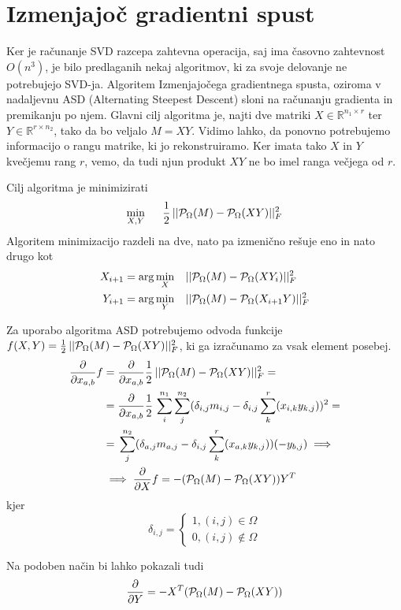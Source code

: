 \section{Izmenjajoč gradientni spust}
Ker je računanje SVD razcepa zahtevna operacija, saj ima časovno zahtevnost
$O(n^3)$, je bilo predlaganih nekaj algoritmov, ki za svoje delovanje ne potrebujejo SVD-ja. Algoritem Izmenjajočega gradientnega spusta, oziroma v nadaljevnu ASD (Alternating Steepest Descent) sloni na računanju gradienta in premikanju po njem. Glavni cilj algoritma je, najti dve matriki $X \in \mathbb{R}^{n_1 \times r}$ ter $Y \in \mathbb{R}^{r \times n_2}$, tako da bo veljalo $M = XY$. Vidimo lahko, da ponovno potrebujemo informacijo o rangu matrike, ki jo rekonstruiramo. Ker imata tako $X$ in $Y$ kvečjemu rang $r$, vemo, da tudi njun produkt $XY$ ne bo imel ranga večjega od $r$. 

Cilj algoritma je minimizirati 
\[
    \min_{X, Y} \hspace{0.5cm} \frac{1}{2}\, ||\mathcal{P}_\Omega(M) - \mathcal{P}_\Omega(XY)||^2_F
\] 
Algoritem minimizacijo razdeli na dve, nato pa izmenično rešuje eno in nato drugo kot 
\begin{align*}
    X_{i+1} &= \arg \min_{X} \hspace{0.3cm} ||\mathcal{P}_\Omega(M) - \mathcal{P}_\Omega(XY_i)||^2_F \\
    Y_{i+1} &= \arg \min_{Y} \hspace{0.3cm} ||\mathcal{P}_\Omega(M) - \mathcal{P}_\Omega(X_{i+1}Y)||^2_F
\end{align*}
\cite{AST-TK15}

Za uporabo algoritma ASD potrebujemo odvoda funkcije $f(X,Y) = \frac{1}{2}\, ||\mathcal{P}_\Omega(M) - \mathcal{P}_\Omega(XY)||^2_F$, ki ga izračunamo za vsak element posebej.
\begin{align*}
    \frac{\partial}{\partial x_{a,b}} f &= \frac{\partial}{\partial x_{a,b}} \frac{1}{2}\, ||\mathcal{P}_\Omega(M) - \mathcal{P}_\Omega(XY)||^2_F = \\
    &= \frac{\partial}{\partial x_{a,b}} \frac{1}{2}\, \sum_{i}^{n_1}\sum_{j}^{n_2}(\delta_{i,j}m_{i,j} - \delta_{i,j}\sum_{k}^{r}(x_{i,k}y_{k,j}))^2 = \\
    &= \, \sum_{j}^{n_2}(\delta_{a,j}m_{a,j} - \delta_{i,j}\sum_{k}^{r}(x_{a,k}y_{k,j}))(-y_{b,j}) \implies \\
    &\implies \frac{\partial}{\partial X}f = -(\mathcal{P}_\Omega(M) - \mathcal{P}_\Omega(XY))Y^T
\end{align*}
kjer 
\[
    \delta_{i,j} = \begin{cases}
        1, (i, j) \in \Omega \\
        0, (i, j) \notin \Omega
    \end{cases}
\]

Na podoben način bi lahko pokazali tudi
\[
    \frac{\partial}{\partial Y} = -X^T (\mathcal{P}_\Omega(M) - \mathcal{P}_\Omega(XY))
\]